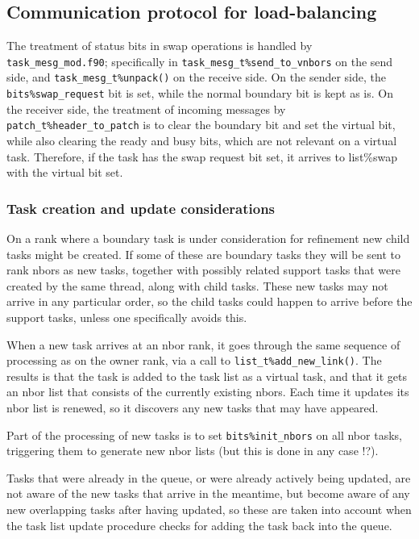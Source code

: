 \documentclass[paper=a4,fontsize=11pt]{scrartcl}
\numberwithin{equation}{section}		%
\numberwithin{figure}{section}			%
\numberwithin{table}{section}				%
\newcommand{\codecolor}{\color{Blue}}
\newcommand{\Code}[1]{{\codecolor\texttt{#1}}}
\begin{document}
\subsection{Communication protocol for load-balancing}
The treatment of status bits in swap operations is handled by \Code{task\_mesg\_mod.f90}; specifically in \Code{task\_mesg\_t\%send\_to\_vnbors} on the send side, and \Code{task\_mesg\_t\%unpack()} on the receive side.  On the sender side, the \Code{bits\%swap\_request} bit is set, while the normal boundary bit is kept as is.  On the receiver side, the treatment of incoming messages by \Code{patch\_t\%header\_to\_patch} is to clear the boundary bit and set the virtual bit, while also clearing the ready and busy bits, which are not relevant on a virtual task.   Therefore, if the task has the swap request bit set, it arrives to list\%swap with the virtual bit set.

\subsubsection{Task creation and update considerations}
On a rank where a boundary task is under consideration for refinement new child tasks might be created.  If some of these are boundary tasks they will be sent to rank nbors as new tasks, together with possibly related support tasks that were created by the same thread, along with child tasks.  These new tasks may not arrive in any particular order, so the child tasks could happen to arrive before the support tasks, unless one specifically avoids this.

When a new task arrives at an nbor rank, it goes through the same sequence of processing as on the owner rank, via a call to \Code{list\_t\%add\_new\_link()}.  The results is that the task is added to the task list as a virtual task, and that it gets an nbor list that consists of the currently existing nbors.  Each time it updates its nbor list is renewed, so it discovers any new tasks that may have appeared.

Part of the processing of new tasks is to set \Code{bits\%init\_nbors} on all nbor tasks, triggering them to generate new nbor lists (but this is done in any case !?).

Tasks that were already in the queue, or were already actively being updated, are not aware of the new tasks that arrive in the meantime, but become aware of any new overlapping tasks after having updated, so these are taken into account when the task list update procedure checks for adding the task back into the queue.
\end{document}
